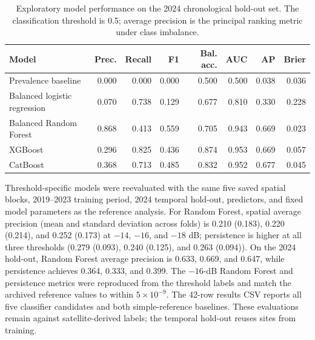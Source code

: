 \documentclass[pdflatex,sn-mathphys,Numbered]{sn-jnl}
\begin{document}
\begin{table}[t]
\centering
\caption{Exploratory model performance on the 2024 chronological hold-out set. The classification threshold is 0.5; average precision is the principal ranking metric under class imbalance.}
\label{tab:model-performance}
\small
\begin{tabular}{lrrrrrrr}
\toprule
Model & Prec. & Recall & F1 & Bal. acc. & AUC & AP & Brier \\
\midrule
Prevalence baseline & 0.000 & 0.000 & 0.000 & 0.500 & 0.500 & 0.038 & 0.036 \\
Balanced logistic regression & 0.070 & 0.738 & 0.129 & 0.677 & 0.810 & 0.330 & 0.228 \\
Balanced Random Forest & 0.868 & 0.413 & 0.559 & 0.705 & 0.943 & 0.669 & 0.023 \\
XGBoost & 0.296 & 0.825 & 0.436 & 0.874 & 0.953 & 0.669 & 0.057 \\
CatBoost & 0.368 & 0.713 & 0.485 & 0.832 & 0.952 & 0.677 & 0.045 \\
\bottomrule
\end{tabular}
\end{table}

\noindent Threshold-specific models were reevaluated with the same five saved spatial blocks, 2019--2023 training period, 2024 temporal hold-out, predictors, and fixed model parameters as the reference analysis. For Random Forest, spatial average precision (mean and standard deviation across folds) is 0.210 (0.183), 0.220 (0.214), and 0.252 (0.173) at $-14$, $-16$, and $-18$ dB; persistence is higher at all three thresholds (0.279 (0.093), 0.240 (0.125), and 0.263 (0.094)). On the 2024 hold-out, Random Forest average precision is 0.633, 0.669, and 0.647, while persistence achieves 0.364, 0.333, and 0.399. The $-16$-dB Random Forest and persistence metrics were reproduced from the threshold labels and match the archived reference values to within $5\times10^{-9}$. The 42-row results CSV reports all five classifier candidates and both simple-reference baselines. These evaluations remain against satellite-derived labels; the temporal hold-out reuses sites from training.
\end{document}
